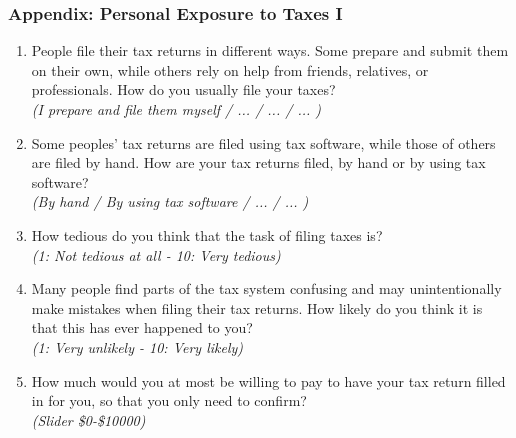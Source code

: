\documentclass{beamer}
\begin{document}
\begin{frame}[label=Personal_Exposure_Appendix]
\frametitle{Appendix: Personal Exposure to Taxes I}
\footnotesize
\begin{enumerate}
    \item People file their tax returns in different ways. Some prepare and submit them on their own, while others rely on help from friends, relatives, or professionals. How do you usually file your taxes?\\ 
    \textit{(I prepare and file them myself / ... /  ... / ... )}
    \item Some peoples' tax returns are filed using tax software, while those of others are filed by hand. How are your tax returns filed, by hand or by using tax software? \\ 
    \textit{(By hand / By using tax software / ... / ... )}
    \item How tedious do you think that the task of filing taxes is? \\ \textit{(1: Not tedious at all - 10: Very tedious)}
    \item Many people find parts of the tax system confusing and may unintentionally make mistakes when filing their tax returns. How likely do you think it is that this has ever happened to you?\\
    \textit{(1: Very unlikely - 10: Very likely) }
    \item How much would you at most be willing to pay to have your tax return filled in for you, so that you only need to confirm? \\
\textit{(Slider \$0-\$10000)} \\

\end{enumerate}
\end{frame}
\end{document}
